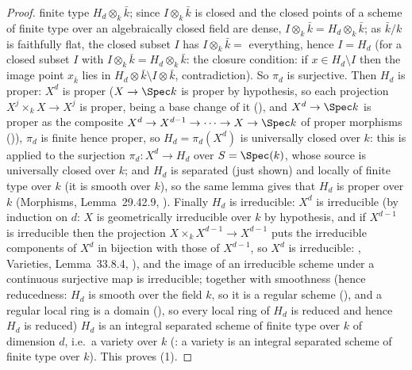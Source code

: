 \begin{proof}
finite type $H_d\otimes_k\bar k$; since
$I\otimes_k\bar k$ is closed and the closed points of a scheme of
finite type over an algebraically closed field are dense,
$I\otimes_k\bar k=H_d\otimes_k\bar k$; as
$\bar k/k$ is faithfully flat, the closed subset $I$ has
$I\otimes_k\bar k=$ everything, hence $I=H_d$ (for a closed subset
$I$ with $I\otimes_k\bar k=H_d\otimes_k\bar k$: the closure
condition: if $x\in H_d\setminus I$ then the image point
$x_{\bar k}$ lies in $H_d\otimes\bar k\setminus I\otimes\bar k$,
contradiction).  So $\pi_d$ is surjective.
  Then $H_d$ is proper: $X^d$ is proper ($X\to\Spec k$ is proper by hypothesis, so each projection $X^{j}\times_kX\to X^{j}$ is proper, being a base change of it (), and $X^d\to\Spec k$ is proper as the composite $X^d\to X^{d-1}\to\cdots\to X\to\Spec k$ of proper morphisms ()), $\pi_d$ is finite hence proper, so
  $H_d=\pi_d(X^d)$ is universally closed over $k$: this is  applied to the surjection $\pi_d:X^d\to H_d$ over $S=\Spec(k)$, whose source is universally closed over $k$; and $H_d$ is separated (just shown) and locally of finite type over $k$ (it is smooth over $k$), so the same lemma gives that $H_d$ is proper over $k$ (Morphisms, Lemma~29.42.9,
).  Finally $H_d$ is irreducible: $X^d$ is irreducible (by induction on $d$: $X$ is geometrically irreducible over $k$ by hypothesis, and if $X^{d-1}$ is irreducible then the projection $X\times_kX^{d-1}\to X^{d-1}$ puts the irreducible components of $X^d$ in bijection with those of $X^{d-1}$, so $X^d$ is irreducible: , Varieties, Lemma~33.8.4,
), and the image of an irreducible scheme under a continuous surjective map is irreducible; together with smoothness (hence reducedness: $H_d$ is smooth over the field $k$, so it is a regular scheme (), and a regular local ring is a domain (), so every local ring of $H_d$ is reduced and hence $H_d$ is reduced) $H_d$ is an integral separated scheme of finite type over $k$ of dimension $d$, i.e.\ a variety over $k$ (: a variety is an integral separated scheme of finite type over $k$).  This proves (1).


\end{proof}
